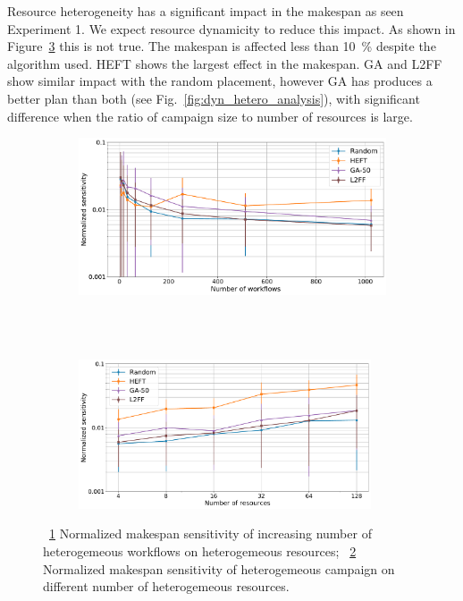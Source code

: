 Resource heterogeneity has a significant impact in the makespan as seen Experiment 1.
We expect resource dynamicity to reduce this impact.
As shown in Figure~\ref{fig:dyn_hetero_sens_analysis} this is not true.
The makespan is affected less than 10~\% despite the algorithm used.
HEFT shows the largest effect in the makespan.
GA and L2FF show similar impact with the random placement, however GA has produces a better plan than both (see Fig.~\ref{fig:dyn_hetero_analysis}), with significant difference when the ratio of campaign size to number of resources is large.

\begin{figure}[ht!]
    \centering
    \begin{subfigure}[b]{0.85\textwidth}
        \includegraphics[width=.95\textwidth]{figures/campaign/StHeteroCampaigns_4DynHeteroResourcesSens.pdf}
        \caption{}
        \label{fig:StHeteroCampaigns_4DyHeteroResourcesSens}
    \end{subfigure}\\
    ~ 
    \begin{subfigure}[b]{0.85\textwidth}
        \includegraphics[width=0.95\textwidth]{figures/campaign/DynHeteroResources_StHeteroCampaignsSens.pdf}
        \caption{}
        \label{fig:DyHeteroResources_StHeteroCampaignsSens}
    \end{subfigure}
    \caption{~\ref{fig:StHeteroCampaigns_4DyHeteroResourcesSens} Normalized makespan sensitivity  of increasing number of heterogemeous workflows on heterogemeous resources;
    ~\ref{fig:DyHeteroResources_StHeteroCampaignsSens} Normalized makespan sensitivity  of heterogemeous campaign on different number of heterogemeous resources.}
    \label{fig:dyn_hetero_sens_analysis}
\end{figure}

